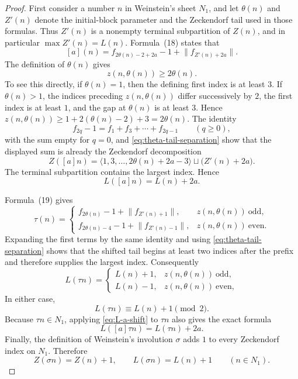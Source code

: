 \begin{proof}
First consider a number \(n\) in Weinstein's sheet \(N_1\), and let
\(\theta(n)\) and \(Z'(n)\) denote the initial-block parameter and the
Zeckendorf tail used in those formulas.  Thus \(Z'(n)\) is a nonempty terminal
subpartition of \(Z(n)\), and in particular \(\max Z'(n)=L(n)\).  Formula~(18)
states that
\[
 [a](n)=f_{2\theta(n)-2+2a}-1+\lVert f_{Z'(n)+2a}\rVert.
\]
The definition of \(\theta(n)\) gives
\begin{equation}
 z(n,\theta(n))\ge2\theta(n).
 \label{eq:theta-tail-separation}
\end{equation}
To see this directly, if \(\theta(n)=1\), then the defining first index is at
least \(3\).  If \(\theta(n)>1\), the indices preceding
\(z(n,\theta(n))\) differ successively by \(2\), the first index is at least
\(1\), and the gap at \(\theta(n)\) is at least \(3\).  Hence
\(z(n,\theta(n))\ge1+2(\theta(n)-2)+3=2\theta(n)\).
The identity
\[
 f_{2q}-1=f_1+f_3+\cdots+f_{2q-1}\qquad(q\ge0),
\]
with the sum empty for \(q=0\), and
\eqref{eq:theta-tail-separation} show that the displayed sum is already the
Zeckendorf decomposition
\[
 Z([a]n)
 =\langle1,3,\ldots,2\theta(n)+2a-3\rangle
   \sqcup\bigl(Z'(n)+2a\bigr).
\]
The terminal subpartition contains the largest index.  Hence
\begin{equation}
 L([a]n)=L(n)+2a.
 \label{eq:L-a-shift}
\end{equation}

Formula~(19) gives
\[
 \tau(n)=
 \begin{cases}
 f_{2\theta(n)}-1+\lVert f_{Z'(n)+1}\rVert,
   &z(n,\theta(n))\ \text{odd},\\
 f_{2\theta(n)-4}-1+\lVert f_{Z'(n)-1}\rVert,
   &z(n,\theta(n))\ \text{even}.
 \end{cases}
\]
Expanding the first terms by the same identity and using
\eqref{eq:theta-tail-separation} shows that the shifted tail begins at least
two indices after the prefix and therefore supplies the largest index.
Consequently
\begin{equation}
 L(\tau n)=
 \begin{cases}
 L(n)+1,&z(n,\theta(n))\ \text{odd},\\
 L(n)-1,&z(n,\theta(n))\ \text{even},
 \end{cases}
 \label{eq:L-tau-shift}
\end{equation}
In either case,
\[
 L(\tau n)\equiv L(n)+1\pmod2.
\]
Because \(\tau n\in N_1\), applying \eqref{eq:L-a-shift} to \(\tau n\)
also gives the exact formula
\begin{equation}
 L([a]\tau n)=L(\tau n)+2a.
 \label{eq:L-a-tau-shift}
\end{equation}
Finally, the definition of Weinstein's involution \(\sigma\) adds \(1\) to
every Zeckendorf index on \(N_1\).  Therefore
\begin{equation}
 Z(\sigma n)=Z(n)+1,
 \qquad L(\sigma n)=L(n)+1
 \qquad(n\in N_1).
 \label{eq:L-sigma-shift}
\end{equation}


\end{proof}
